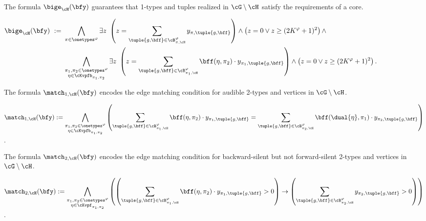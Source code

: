 \begin{compactitem}
    \item
    The formula $\bige_{\cH}(\bfy)$ guarantees that 1-types and tuples realized in $\cG \setminus \cH$ satisfy the requirements of a core. \\
    \begin{notsotiny}
    $
    \begin{aligned}
        \bige_{\cH}(\bfy)
        \ :=\ &
        \bigwedge_{\pi \in \onetypes^\varphi}
            \exists z\ 
            \left(
                z = \sum_{\tuple{g, \bff} \in \cB^\varphi_{\pi, \cH}} y_{\pi, \tuple{g, \bff}}
            \right) \land
            \left(
                z = 0  \lor
                z \ge (2K^\varphi+1)^2 
            \right)
        \land \\
        &\bigwedge_{\substack{
            \pi_1, \pi_2 \in \onetypes^\varphi \\ 
            \eta \in \cKvpfb_{\pi_1, \pi_2}}}
        \exists z\ 
        \left(z = \sum_{\tuple{g, \bff} \in \cB^\varphi_{\pi_1, \cH}} \bff(\eta, \pi_2) \cdot y_{\pi_1, \tuple{g, \bff}}\right) \land
        \left(
            z = 0 \lor
            z \ge (2K^\varphi+1)^2
            \right).
        \end{aligned}
    $
    \end{notsotiny}
    \item
        The formula $\match_{1, \cH}(\bfy)$ encodes the edge matching condition for audible 2-types and vertices in $\cG \setminus \cH$. \\
        \begin{notsotiny}
        $\displaystyle
        \match_{1, \cH}(\bfy)
         := 
        \bigwedge_{\substack{
            \pi_1, \pi_2 \in \onetypes^\varphi \\
            \eta \in \cKvpfb_{\pi_1, \pi_2}}}
        \left(
            \sum_{\tuple{g, \bff} \in \cB^{\varphi}_{\pi_1, \cH}} \bff(\eta, \pi_2) \cdot y_{\pi_1, \tuple{g, \bff}}
            =
            \sum_{\tuple{g, \bff} \in \cB^{\varphi}_{\pi_2, \cH}} \bff(\dual{\eta}, \pi_1) \cdot y_{\pi_2, \tuple{g, \bff}}
        \right)
        $.
        \end{notsotiny}

    \item
        The formula $\match_{2, \cH}(\bfy)$ encodes the edge matching condition for backward-silent but not forward-silent 2-types and vertices in $\cG \setminus \cH$. \\
        \begin{notsotiny}
        $\displaystyle
        \match_{2, \cH}(\bfy)
         := 
        \bigwedge_{\substack{
            \pi_1, \pi_2 \in \onetypes^\varphi \\
            \eta \in \cKvpf_{\pi_1, \pi_2}}}
        \left(
            \left(
                \sum_{\tuple{g, \bff} \in \cB^{\varphi}_{\pi_1, \cH}} \bff(\eta, \pi_2) \cdot y_{\pi_1, \tuple{g, \bff}} > 0
            \right)
            \to
            \left(
                \sum_{\tuple{g, \bff} \in \cB^{\varphi}_{\pi_2, \cH}} y_{\pi_2, \tuple{g, \bff}} > 0
            \right)
        \right)
        $.
        \end{notsotiny}
        

\end{compactitem}
